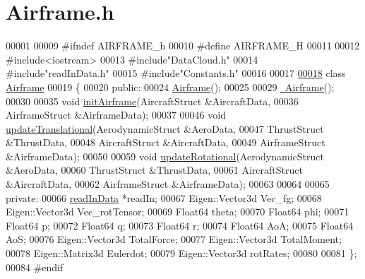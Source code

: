 \hypertarget{_airframe_8h_source}{}\section{Airframe.\+h}
\label{_airframe_8h_source}

\begin{DoxyCode}
00001 
00009 \textcolor{preprocessor}{#ifndef AIRFRAME\_h}
00010 \textcolor{preprocessor}{#define AIRFRAME\_H}
00011 
00012 \textcolor{preprocessor}{#include<iostream>}
00013 \textcolor{preprocessor}{#include"DataCloud.h"}
00014 \textcolor{preprocessor}{#include"readInData.h"}
00015 \textcolor{preprocessor}{#include"Constants.h"}
00016 
00017 
\hyperlink{group___airframe}{00018} \textcolor{keyword}{class }\hyperlink{group___airframe_class_airframe}{Airframe}
00019 \{
00020 \textcolor{keyword}{public}:
00024     \hyperlink{group___airframe_a5e6632c7d0c5bc5b889de6cc2407944f}{Airframe}();
00025 
00029     \hyperlink{group___airframe_af849116afbf7c4d7d2d5c189ff68cb7d}{~Airframe}();
00030 
00035     \textcolor{keywordtype}{void} \hyperlink{group___airframe_a57b5f7a74d11723186f34fc183e1581b}{initAirframe}(AircraftStruct    &AircraftData,
00036                       AirframeStruct    &AirframeData);
00037 
00046     \textcolor{keywordtype}{void} \hyperlink{group___airframe_ab3e18bd40fd5e68d793a164654a2821a}{updateTranslational}(AerodynamicStruct  &AeroData,
00047                              ThrustStruct       &ThrustData,
00048                               AircraftStruct    &AircraftData,
00049                             AirframeStruct &AirframeData);
00050 
00059     \textcolor{keywordtype}{void} \hyperlink{group___airframe_af506bca34fa40f9ec0613b3be8f726eb}{updateRotational}(AerodynamicStruct  &AeroData,
00060                             ThrustStruct        &ThrustData,
00061                             AircraftStruct  &AircraftData,
00062                             AirframeStruct &AirframeData);
00063 
00064 
00065 \textcolor{keyword}{private}:
00066     \hyperlink{classread_in_data}{readInData} *readIn;
00067     Eigen::Vector3d Vec\_fg;
00068     Eigen::Vector3d Vec\_rotTensor;
00069     Float64 theta;
00070     Float64 phi;
00071     Float64 p;
00072     Float64 q;
00073     Float64 r;
00074     Float64 AoA;
00075     Float64 AoS;
00076     Eigen::Vector3d TotalForce;
00077     Eigen::Vector3d TotalMoment;
00078     Eigen::Matrix3d Eulerdot;
00079     Eigen::Vector3d rotRates;
00080 
00081 \};
00084 \textcolor{preprocessor}{#endif }
\end{DoxyCode}
